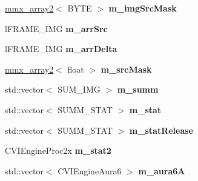 \begin{DoxyCompactItemize}
\item 
\hypertarget{class_c_v_i_engine_base_a879bfc4065da678c4ca67ed828b05a05}{\hyperlink{classmmx__array2}{mmx\+\_\+array2}$<$ B\+Y\+T\+E $>$ {\bfseries m\+\_\+img\+Src\+Mask}}\label{class_c_v_i_engine_base_a879bfc4065da678c4ca67ed828b05a05}

\item 
\hypertarget{class_c_v_i_engine_base_a9b14da4c2f0ccba53a81ab89b89b2a03}{l\+F\+R\+A\+M\+E\+\_\+\+I\+M\+G {\bfseries m\+\_\+arr\+Src}}\label{class_c_v_i_engine_base_a9b14da4c2f0ccba53a81ab89b89b2a03}

\item 
\hypertarget{class_c_v_i_engine_base_abd1077e6704b0f6bbc788c4d3e7f150e}{l\+F\+R\+A\+M\+E\+\_\+\+I\+M\+G {\bfseries m\+\_\+arr\+Delta}}\label{class_c_v_i_engine_base_abd1077e6704b0f6bbc788c4d3e7f150e}

\item 
\hypertarget{class_c_v_i_engine_base_a0b3b91816e3f19ec5e531c5ad903be98}{\hyperlink{classmmx__array2}{mmx\+\_\+array2}$<$ float $>$ {\bfseries m\+\_\+src\+Mask}}\label{class_c_v_i_engine_base_a0b3b91816e3f19ec5e531c5ad903be98}

\item 
\hypertarget{class_c_v_i_engine_base_a29b792994f8c587ebdd4296031032f68}{std\+::vector$<$ S\+U\+M\+\_\+\+I\+M\+G $>$ {\bfseries m\+\_\+summ}}\label{class_c_v_i_engine_base_a29b792994f8c587ebdd4296031032f68}

\item 
\hypertarget{class_c_v_i_engine_base_a73ff2aaa9eeb589ce6ea73ef5dd62fda}{std\+::vector$<$ S\+U\+M\+M\+\_\+\+S\+T\+A\+T $>$ {\bfseries m\+\_\+stat}}\label{class_c_v_i_engine_base_a73ff2aaa9eeb589ce6ea73ef5dd62fda}

\item 
\hypertarget{class_c_v_i_engine_base_ab0a3c99fb49cddb42615132833b483d5}{std\+::vector$<$ S\+U\+M\+M\+\_\+\+S\+T\+A\+T $>$ {\bfseries m\+\_\+stat\+Release}}\label{class_c_v_i_engine_base_ab0a3c99fb49cddb42615132833b483d5}

\item 
\hypertarget{class_c_v_i_engine_base_a91282745c78c776f8922e20c4f3198f5}{C\+V\+I\+Engine\+Proc2x {\bfseries m\+\_\+stat2}}\label{class_c_v_i_engine_base_a91282745c78c776f8922e20c4f3198f5}

\item 
\hypertarget{class_c_v_i_engine_base_aa4b9c935b9223f0efcc05282e871254d}{std\+::vector$<$ C\+V\+I\+Engine\+Aura6 $>$ {\bfseries m\+\_\+aura6\+A}}\label{class_c_v_i_engine_base_aa4b9c935b9223f0efcc05282e871254d}


\end{DoxyCompactItemize}
